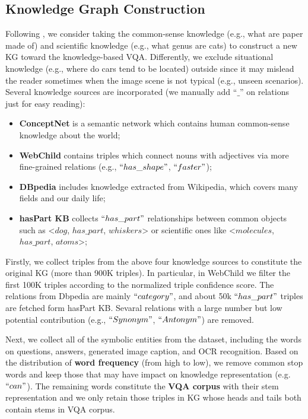 \documentclass[sigconf]{acmart}
\newcommand{\cjy}[1]{{\color{black}#1}}
\begin{document}
\subsection{Knowledge Graph Construction} \label{sec:KGc}
Following \citep{DBLP:conf/cvpr/MarinoCP0R21}, we  consider taking the common-sense knowledge (e.g., what are paper made of) and scientiﬁc knowledge (e.g., what genus are cats) to construct a new KG toward the knowledge-based VQA.
Differently, we exclude situational knowledge (e.g., where do cars tend to be located) outside since it may mislead the reader sometimes when the image scene is not typical (e.g., unseen scenarios).
Several knowledge sources are incorporated (we manually add ``$\_$'' on relations just for easy reading): 
\begin{itemize}
\item\textbf{ConceptNet} \citep{DBLP:conf/aaai/SpeerCH17} is a semantic network which contains human common-sense knowledge about the world;

\item\textbf{WebChild} \citep{DBLP:conf/acl/TandonMW17} contains triples which connect nouns with adjectives via more fine-grained relations (e.g., $``has\_shape"$, $``faster"$);

\item\textbf{DBpedia} \citep{DBLP:conf/semweb/AuerBKLCI07} \cjy{includes knowledge extracted from Wikipedia, which covers many fields and our daily life;}

\item\textbf{hasPart KB} \citep{DBLP:journals/corr/abs-2006-07510} collects $``has\_part"$ relationships between common objects such as <$dog$, $has\_part$, $whiskers$> or scientific ones like <$molecules$, $has\_part$, $atoms$>; 
\end{itemize}
Firstly, we collect triples from the above four knowledge sources to constitute the original KG (more than 900K triples). 
In particular, in  WebChild we filter the first 100K triples according to the normalized triple confidence score. The relations from Dbpedia are mainly $``category"$, and about 50k $``has\_part"$ triples are fetched form hasPart KB. Sevaral relations with a large number  but low potential contribution (e.g., $``Synonym"$, $``Antonym"$) are removed.

Next, we collect all of the symbolic entities from the dataset, including the words on questions, answers, generated image caption, and OCR recognition.
Based on the distribution of \textbf{word frequency} (from high to low), we remove common stop words and keep those that may have impact on knowledge representation (e.g. $``can"$). 
The \cjy{remaining words}
constitute the \textbf{VQA corpus} with their stem representation and we only retain those triples in KG whose heads and tails both contain stems in VQA corpus.
\end{document}

